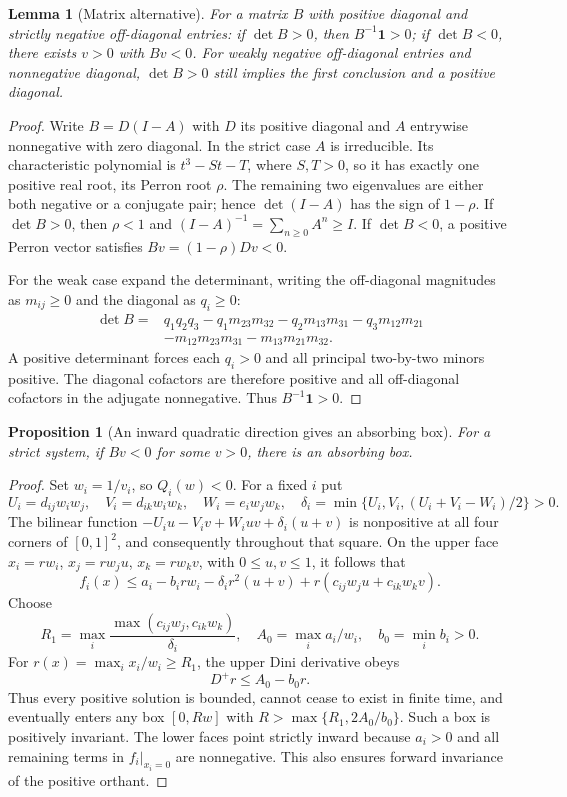 \documentclass[11pt]{article}
\newtheorem{lemma}[theorem]{Lemma}
\newtheorem{proposition}[theorem]{Proposition}
\theoremstyle{remark}\newtheorem{remark}[theorem]{Remark}
\newcommand{\one}{\mathbf 1}
\begin{document}
\begin{lemma}[Matrix alternative]\label{lem:matrix}
For a matrix $B$ with positive diagonal and strictly negative off-diagonal entries:
if $\det B>0$, then $B^{-1}\one>0$; if $\det B<0$, there exists $v>0$ with $Bv<0$.
For weakly negative off-diagonal entries and nonnegative diagonal, $\det B>0$
still implies the first conclusion and a positive diagonal.
\end{lemma}
\begin{proof}
Write $B=D(I-A)$ with $D$ its positive diagonal and $A$ entrywise nonnegative
with zero diagonal. In the strict case $A$ is irreducible. Its characteristic
polynomial is $t^3-St-T$, where $S,T>0$, so it has exactly one positive real root,
its Perron root $\rho$. The remaining two eigenvalues are either both negative
or a conjugate pair; hence $\det(I-A)$ has the sign of $1-\rho$. If
$\det B>0$, then $\rho<1$ and $(I-A)^{-1}=\sum_{n\ge0}A^n\ge I$.
If $\det B<0$, a positive Perron vector satisfies
$Bv=(1-\rho)Dv<0$.

For the weak case expand the determinant, writing the off-diagonal magnitudes
as $m_{ij}\ge0$ and the diagonal as $q_i\ge0$:
\begin{align*}
\det B={}&q_1q_2q_3-q_1m_{23}m_{32}-q_2m_{13}m_{31}
-q_3m_{12}m_{21}\\
&-m_{12}m_{23}m_{31}-m_{13}m_{21}m_{32}.
\end{align*}
A positive determinant forces each $q_i>0$ and all principal two-by-two minors
positive. The diagonal cofactors are therefore positive and all off-diagonal
cofactors in the adjugate nonnegative. Thus $B^{-1}\one>0$.
\end{proof}

\begin{proposition}[An inward quadratic direction gives an absorbing box]\label{prop:inward}
For a strict system, if $Bv<0$ for some $v>0$, there is an absorbing box.
\end{proposition}
\begin{proof}
Set $w_i=1/v_i$, so $Q_i(w)<0$. For a fixed $i$ put
\[
 U_i=d_{ij}w_iw_j,\quad V_i=d_{ik}w_iw_k,\quad W_i=e_iw_jw_k,
 \quad \delta_i=\min\{U_i,V_i,(U_i+V_i-W_i)/2\}>0.
\]
The bilinear function
$-U_i u-V_i v+W_iuv+\delta_i(u+v)$ is nonpositive at all four corners of
$[0,1]^2$, and consequently throughout that square. On the upper face
$x_i=rw_i$, $x_j=rw_ju$, $x_k=rw_kv$, with $0\le u,v\le1$, it follows that
\[
 f_i(x)\le a_i-b_irw_i-\delta_i r^2(u+v)
              +r(c_{ij}w_ju+c_{ik}w_kv).
\]
Choose
\[
 R_1=\max_i\frac{\max(c_{ij}w_j,c_{ik}w_k)}{\delta_i},\quad
 A_0=\max_i a_i/w_i,\quad b_0=\min_i b_i>0.
\]
For $r(x)=\max_i x_i/w_i\ge R_1$, the upper Dini derivative obeys
\[
 D^+r\le A_0-b_0r.
\]
Thus every positive solution is bounded, cannot cease to exist in finite time,
and eventually enters any box $[0,Rw]$ with
$R>\max\{R_1,2A_0/b_0\}$. Such a box is positively invariant. The lower faces
point strictly inward because $a_i>0$ and all remaining terms in $f_i|_{x_i=0}$
are nonnegative. This also ensures forward invariance of the positive orthant.
\end{proof}
\end{document}
